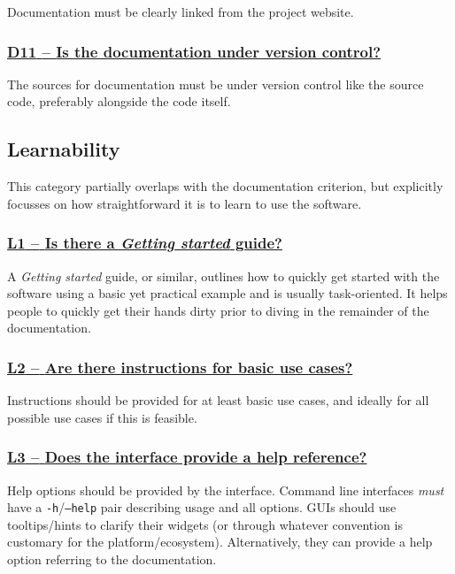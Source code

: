 \documentclass[a4paper,11pt]{article}
\newcommand{\criterion}[1]{\subsubsection*{\underline{#1}}}
\begin{document}
Documentation must be clearly linked from the project website.

\newcommand{\dElevenID}{D11}
\newcommand{\dElevenText}{Is the documentation under version control?}
\criterion{\dElevenID{ }--{ }\dElevenText}\label{id:d11}

The sources for documentation must be under version control like the source
code, preferably alongside the code itself.

\subsection{Learnability}\label{sec:lea}

This category partially overlaps with the documentation criterion, but explicitly
focusses on how straightforward it is to learn to use the software.

\newcommand{\lOneID}{L1}
\newcommand{\lOneText}{Is there a \textit{Getting started} guide?}
\criterion{\lOneID{ }--{ }\lOneText}\label{id:l1} %

A \textit{Getting started} guide, or similar, outlines how to quickly get
started with the software using a basic yet practical example and is usually task-oriented.
It helps people to quickly get their hands dirty prior to diving in the
remainder of the documentation. 

\newcommand{\lTwoID}{L2}
\newcommand{\lTwoText}{Are there instructions for basic use cases?}
\criterion{\lTwoID{ }--{ }\lTwoText}\label{id:l2} 

Instructions should be provided for at least basic use cases, and ideally for
all possible use cases if this is feasible.

%
%
%

\newcommand{\lThreeID}{L3}
\newcommand{\lThreeText}{Does the interface provide a help reference?}
\criterion{\lThreeID{ }--{ }\lThreeText}\label{id:l3} 

Help options should be provided by the interface. Command line interfaces
\emph{must} have a \texttt{-h}/\texttt{--help} pair describing usage and all options. GUIs should use tooltips/hints to clarify
their widgets (or through whatever convention is customary for the
platform/ecosystem). Alternatively, they can provide a help option referring to
the documentation.
\end{document}
